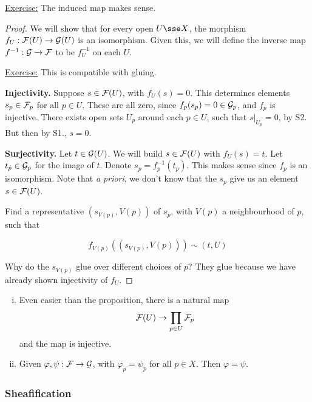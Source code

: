 \documentclass{article}
\begin{document}
\underline{Exercise:} The induced map makes sense.

\begin{proof}
    We will show that for every open \(U \sse X\), the morphism \(f_U : \mathcal{F}(U) \to \mathcal{G}(U)\) is an isomorphism. Given this, we will define the inverse map \(f^{-1} : \mathcal{G} \to \mathcal{F}\) to be \(f_U^{-1}\) on each \(U\).

    \underline{Exercise:} This is compatible with gluing.

    \textbf{Injectivity.} Suppose \(s \in \mathcal{F}(U)\), with \(f_U(s) = 0\). This determines elements \(s_p \in \mathcal{F}_p\) for all \(p \in U\). These are all zero, since \(f_p(s_p) = 0 \in \mathcal{G}_p\), and \(f_p\) is injective. There exists open sets \(U_p\) around each \(p \in U\), such that \(s\vert_{U_p} = 0\), by S2. But then by S1., \(s = 0\).

    \textbf{Surjectivity.} Let \(t \in \mathcal{G}(U)\). We will build \(s \in \mathcal{F}(U)\) with \(f_U(s) = t\). Let \(t_p \in \mathcal{G}_p\) for the image of \(t\). Denote \(s_p = f_p^{-1}(t_p)\). This makes sense since \(f_p\) is an isomorphism. Note that \emph{a priori}, we don't know that the \(s_p\) give us an element \(s \in \mathcal{F}(U)\).

    Find a representative \((s_{V(p)}, V(p))\) of \(s_p\), with \(V(p)\) a neighbourhood of \(p\), such that 
    
    \[f_{V(p)}((s_{V(p)}, V(p))) \sim (t, U)\]

    Why do the \(s_{V(p)}\) glue over different choices of \(p\)? They glue because we have already shown injectivity of \(f_U\).
\end{proof}

\begin{remark}
    \begin{enumerate}[(i)]
        \item Even easier than the proposition, there is a natural map
        \[\mathcal{F}(U) \to \prod_{p \in U}\mathcal{F}_p\]
        and the map is injective.
        \item Given \(\varphi, \psi : \mathcal{F} \to \mathcal{G}\), with \(\varphi_p = \psi_p\) for all \(p \in X\). Then \(\varphi = \psi\).
    \end{enumerate}
\end{remark}

\lec

\subsubsection*{Sheafification}
\end{document}
